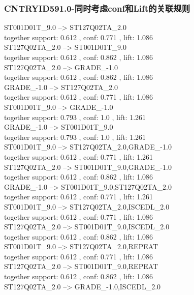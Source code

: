 \documentclass[12pt, a4paper, oneside]{ctexart}
\begin{document}
\subsubsection{CNTRYID591.0-同时考虑conf和Lift的关联规则 } 

ST001D01T\_9.0 --> ST127Q02TA\_2.0 \\
 together support: 0.612 , conf: 0.771 , lift: 1.086\\
ST127Q02TA\_2.0 --> ST001D01T\_9.0 \\
 together support: 0.612 , conf: 0.862 , lift: 1.086\\
ST127Q02TA\_2.0 --> GRADE\_-1.0 \\
 together support: 0.612 , conf: 0.862 , lift: 1.086\\
GRADE\_-1.0 --> ST127Q02TA\_2.0 \\
 together support: 0.612 , conf: 0.771 , lift: 1.086\\
ST001D01T\_9.0 --> GRADE\_-1.0 \\
  together support: 0.793 , conf: 1.0 , lift: 1.261\\
GRADE\_-1.0 --> ST001D01T\_9.0 \\
  together support: 0.793 , conf: 1.0 , lift: 1.261\\
ST001D01T\_9.0 --> ST127Q02TA\_2.0,GRADE\_-1.0 \\
 together support: 0.612 , conf: 0.771 , lift: 1.261\\
ST127Q02TA\_2.0 --> ST001D01T\_9.0,GRADE\_-1.0 \\
 together support: 0.612 , conf: 0.862 , lift: 1.086\\
GRADE\_-1.0 --> ST001D01T\_9.0,ST127Q02TA\_2.0 \\
 together support: 0.612 , conf: 0.771 , lift: 1.261\\
ST001D01T\_9.0 --> ST127Q02TA\_2.0,ISCEDL\_2.0 \\
 together support: 0.612 , conf: 0.771 , lift: 1.086\\
ST127Q02TA\_2.0 --> ST001D01T\_9.0,ISCEDL\_2.0 \\
 together support: 0.612 , conf: 0.862 , lift: 1.086\\
ST001D01T\_9.0 --> ST127Q02TA\_2.0,REPEAT \\
 together support: 0.612 , conf: 0.771 , lift: 1.086\\
ST127Q02TA\_2.0 --> ST001D01T\_9.0,REPEAT \\
 together support: 0.612 , conf: 0.862 , lift: 1.086\\
ST127Q02TA\_2.0 --> GRADE\_-1.0,ISCEDL\_2.0 \\
\end{document}
